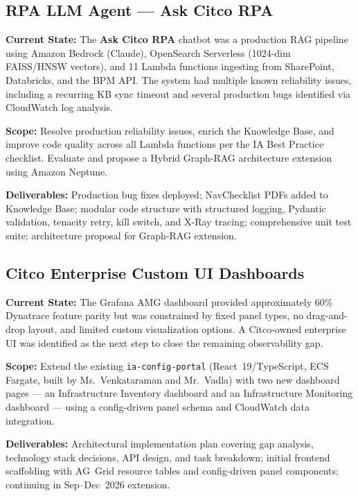 \subsection{RPA LLM Agent --- Ask Citco RPA}

\textbf{Current State:} 
The \textbf{Ask Citco RPA} chatbot was a
production RAG pipeline using Amazon Bedrock (Claude), OpenSearch
Serverless (1024-dim FAISS/HNSW vectors), and 11 Lambda functions
ingesting from SharePoint, Databricks, and the BPM API. The system
had multiple known reliability issues, including a recurring KB sync
timeout and several production bugs identified via CloudWatch log analysis.

\textbf{Scope:} 
Resolve production reliability issues, enrich the
Knowledge Base, and improve code quality across all Lambda functions
per the IA Best Practice checklist. Evaluate and propose a Hybrid
Graph-RAG architecture extension using Amazon Neptune.

\textbf{Deliverables:} 
Production bug fixes deployed; NavChecklist PDFs
added to Knowledge Base; modular code structure with structured logging,
Pydantic validation, tenacity retry, kill switch, and X-Ray tracing;
comprehensive unit test suite; architecture proposal for Graph-RAG extension.


\subsection{Citco Enterprise Custom UI Dashboards}

\textbf{Current State:} 
The Grafana AMG dashboard provided approximately
60\% Dynatrace feature parity but was constrained by fixed panel types,
no drag-and-drop layout, and limited custom visualization options. A
Citco-owned enterprise UI was identified as the next step to close
the remaining observability gap.

\textbf{Scope:} 
Extend the existing \texttt{ia-config-portal}
(React~19/TypeScript, ECS Fargate, built by Ms.\ Venkataraman and Mr.\ Vadla)
with two new dashboard pages --- an Infrastructure Inventory dashboard
and an Infrastructure Monitoring dashboard ---
using a config-driven panel schema and CloudWatch data integration.

\textbf{Deliverables:} 
Architectural implementation plan covering gap
analysis, technology stack decisions, API design, and task breakdown;
initial frontend scaffolding with AG~Grid resource tables and
config-driven panel components; continuing in Sep--Dec~2026 extension.


